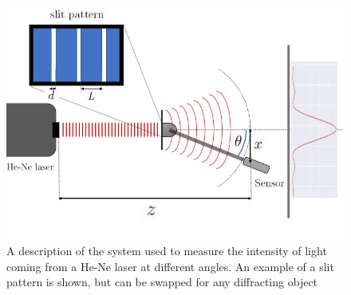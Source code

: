 \begin{figure}[H]
    \includegraphics[width=0.9\columnwidth]{figures/Apparatus.JPG}
    \caption{A description of the system used to measure the intensity of light coming from a He-Ne laser at different angles. An example of a slit
    pattern is shown, but can be swapped for any diffracting object}
    \label{fig:Apparatus}
\end{figure}